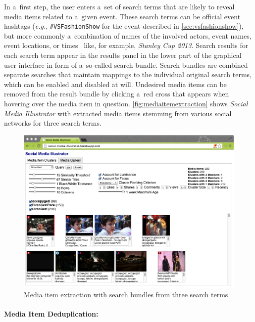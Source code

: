 In a~first step, the user enters a~set of search terms
that are likely to reveal media items related to a~given event.
These search terms can be official event hashtags
(\emph{e.g.}, \texttt{\#VSFashionShow}
for the event described in \autoref{sec:vsfashionshow}),
but more commonly a~combination of names of the involved actors,
event names, event locations, or times~%
\cite{becker2010eventidentification,becker2012plannedevents}
like, for example, \emph{Stanley Cup 2013}.
Search results for each search term appear in the results panel
in the lower part of the graphical user interface
in form of a~so-called search bundle.
Search bundles are combined separate searches
that maintain mappings to the individual original search terms,
which can be enabled and disabled at will.
Undesired media items can be removed from the result bundle
by clicking a~red cross that appears
when hovering over the media item in question.
\autoref{fig:mediaitemextraction} shows \emph{Social Media Illustrator}
with extracted media items stemming from various social networks
for three search terms.

\begin{figure}[!ht]
  \centering
  \includegraphics[width=1\columnwidth]{app1.png}
  \caption{Media item extraction with search bundles from three search terms}
  \label{fig:mediaitemextraction}
\end{figure}

\paragraph{Media Item Deduplication:}

